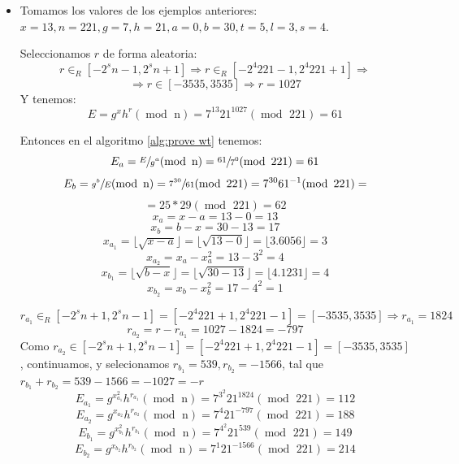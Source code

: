\begin{itemize}
    \item Tomamos los valores de los ejemplos anteriores: $x = 13, n = 221, g = 7, h = 21, a = 0, b = 30, t = 5, l = 3, s = 4$.

    Seleccionamos $r$ de forma aleatoria:
    $$r \in_{R} [-2^{s}n-1, 2^{s}n+1] \Rightarrow r \in_{R} [-2^{4}221-1, 2^{4}221+1] \Rightarrow$$ $$\Rightarrow r \in [-3535, 3535] \Rightarrow r = 1027$$
    Y tenemos:
    $$E = g^{x}h^{r} (\operatorname{mod} \text{ n}) = 7^{13}21^{1027} (\operatorname{mod} \text{ 221}) = 61$$

    Entonces en el algoritmo \eqref{alg:prove wt} tenemos:
    $$E_{a} = \sfrac{E}{g^{a}} (\operatorname{mod} \text{ n}) = \sfrac{61}{7^{0}} (\operatorname{mod} \text{ 221}) = 61$$
    $$E_{b} = \sfrac{g^{b}}{E} (\operatorname{mod} \text{ n}) = \sfrac{7^{30}}{61} (\operatorname{mod} \text{ 221}) = 7^{30} 61^{-1} (\operatorname{mod} \text{ 221}) =$$ $$= 25 * 29 (\operatorname{mod} \text{ 221}) = 62$$
    $$x_{a} = x - a = 13 - 0 = 13$$
    $$x_{b} = b - x = 30 - 13 = 17$$
    $$x_{a_{1}} = \lfloor \sqrt{x-a} \rfloor = \lfloor \sqrt{13-0} \rfloor = \lfloor 3.6056 \rfloor = 3$$
    $$x_{a_{2}} = x_{a} - x_{a}^{2} = 13 - 3^{2} = 4$$
    $$x_{b_{1}} = \lfloor \sqrt{b-x} \rfloor = \lfloor \sqrt{30-13} \rfloor = \lfloor 4.1231 \rfloor = 4$$
    $$x_{b_{2}} = x_{b} - x_{b}^{2} = 17 - 4^{2} = 1$$
    
    $$r_{a_{1}} \in_{R} [-2^{s}n+1, 2^{s}n-1] = [-2^{4}221+1, 2^{4}221-1] = [-3535, 3535] \Rightarrow r_{a_{1}} = 1824$$
    $$r_{a_{2}} = r - r_{a_{1}} = 1027 - 1824 = -797$$
    Como $r_{a_{2}} \in [-2^{s}n+1, 2^{s}n-1] = [-2^{4}221+1, 2^{4}221-1] = [-3535, 3535]$, continuamos, y selecionamos $r_{b_{1}} = 539, r_{b_{2}} = -1566$, tal que $r_{b_{1}} + r_{b_{2}} = 539 - 1566 = -1027 = -r$
    $$E_{a_{1}} = g^{x^{2}_{a_{1}}}h^{r_{a_{1}}} (\operatorname{mod} \text{ n}) = 7^{3^{2}}21^{1824} (\operatorname{mod} \text{ 221}) = 112$$
    $$E_{a_{2}} = g^{x_{a_{2}}}h^{r_{a_{2}}} (\operatorname{mod} \text{ n}) = 7^{4}21^{-797} (\operatorname{mod} \text{ 221}) = 188$$
    $$E_{b_{1}} = g^{x^{2}_{b_{1}}}h^{r_{b_{1}}} (\operatorname{mod} \text{ n}) = 7^{4^{2}}21^{539} (\operatorname{mod} \text{ 221}) = 149$$
    $$E_{b_{2}} = g^{x_{b_{2}}}h^{r_{b_{2}}} (\operatorname{mod} \text{ n}) = 7^{1}21^{-1566} (\operatorname{mod} \text{ 221}) = 214$$
    

\end{itemize}
